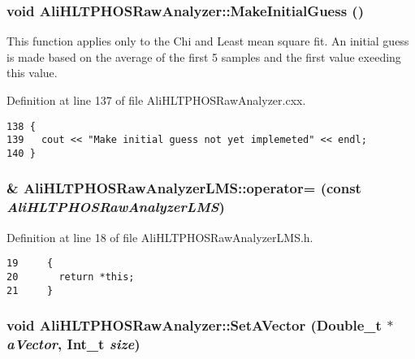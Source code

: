 \subsubsection{\setlength{\rightskip}{0pt plus 5cm}void Ali\-HLTPHOSRaw\-Analyzer::Make\-Initial\-Guess ()\hspace{0.3cm}{\tt  [inherited]}}\label{classAliHLTPHOSRawAnalyzer_AliHLTPHOSRawAnalyzerPeakFindera15}


This function applies only to the Chi and Least mean square fit. An initial guess is made based on the average of the first 5 samples and the first value exeeding this value. 

Definition at line 137 of file Ali\-HLTPHOSRaw\-Analyzer.cxx.

\footnotesize\begin{verbatim}138 {
139   cout << "Make initial guess not yet implemeted" << endl;
140 }
\end{verbatim}\normalsize 


\subsubsection{\& Ali\-HLTPHOSRaw\-Analyzer\-LMS::operator= (const  {\em Ali\-HLTPHOSRaw\-Analyzer\-LMS})\hspace{0.3cm}{\tt  [inline]}}\label{classAliHLTPHOSRawAnalyzerLMS_AliHLTPHOSRawAnalyzerLMSa3}




Definition at line 18 of file Ali\-HLTPHOSRaw\-Analyzer\-LMS.h.

\footnotesize\begin{verbatim}19     {
20       return *this; 
21     }
\end{verbatim}\normalsize 


\subsubsection{\setlength{\rightskip}{0pt plus 5cm}void Ali\-HLTPHOSRaw\-Analyzer::Set\-AVector (Double\_\-t $\ast$ {\em a\-Vector}, Int\_\-t {\em size})\hspace{0.3cm}{\tt  [virtual, inherited]}}\label{classAliHLTPHOSRawAnalyzer_AliHLTPHOSRawAnalyzerLMSa17}




